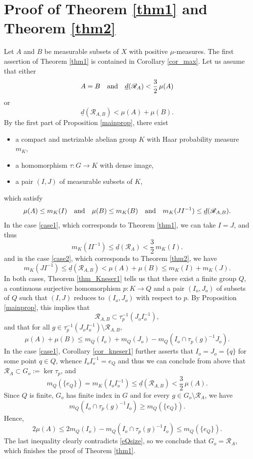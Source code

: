 \documentclass[JEP,XML,SOM,Unicode]{cedram}
\let\mathcal\mathscr
\newcommand{\cR}{\mathcal{R}}
\newcommand{\qand}{\quad\textup{and}\quad}
\theoremstyle{plain}
\theoremstyle{definition}
\begin{document}
\section{Proof of Theorem \ref{thm1} and Theorem \ref{thm2}}

Let $A$ and $B$ be measurable subsets of $X$ with positive $\mu$-measures. The first assertion of Theorem \ref{thm1} is contained
in Corollary \ref{cor_max}. Let us assume that either
\begin{equation}
\label{case1}
A = B \qand \underline{d}(\cR_{A}) < \frac{3}{2}\, \mu(A)
\end{equation}
or
\begin{equation}
\label{case2}
\underline{d}(\cR_{A,B}) < \mu(A) + \mu(B).
\end{equation}
By the first part of Proposition \ref{mainprop}, there exist
\begin{itemize}
\item a compact and metrizable abelian group $K$ with Haar probability measure $m_K$,
\item a homomorphism $\tau : G \to K$ with dense image,
\item a pair $(I,J)$ of measurable subsets of $K$,
\end{itemize}
which satisfy
\[
\mu(A) \leq m_K(I) \qand \mu(B) \leq m_K(B) \qand m_K(JI^{-1}) \leq \underline{d}(\cR_{A,B}).
\]
In the case \eqref{case1}, which corresponds to Theorem \ref{thm1}, we can take $I = J$, and thus
\[
m_K(II^{-1}) \leq \underline{d}(\cR_{A}) < \frac{3}{2} \, m_K(I).
\]
and in the case \eqref{case2}, which corresponds to Theorem \ref{thm2}, we have
\[
m_K(JI^{-1}) \leq \underline{d}(\cR_{A,B}) < \mu(A) + \mu(B) \leq m_K(I) + m_K(J).
\]
In both cases, Theorem \ref{thm_Kneser1} tells us that there exist a finite group $Q$, a continuous surjective homomorphism
$p : K \to Q$ and a pair $(I_o,J_o)$ of subsets of $Q$ such that $(I,J)$ reduces to $(I_o,J_o)$ with respect to $p$.
By Proposition \ref{mainprop}, this implies that
\[
\cR_{A,B} \subset \tau_p^{-1}(J_o I_o^{-1}),
\]
and that for all $g \in \tau_p^{-1}(J_o I_o^{-1}) \setminus \cR_{A,B}$,
\[
\mu(A) + \mu(B) \leq m_Q(I_o) + m_Q(J_o) - m_Q(I_o \cap \tau_p(g)^{-1}J_o).
\]
In the case \eqref{case1}, Corollary \ref{cor_kneser1} further asserts that $I_o = J_o = \{q\}$ for some point $q \in Q$, whence
$I_o I_o^{-1} = e_Q$ and thus we can conclude from above that $\cR_{A} \subset G_o := \ker \tau_p$, and
\begin{equation}
\label{eQsize}
m_Q(\{e_Q\}) = m_K(I_o I_o^{-1}) \leq \underline{d}(\cR_{A,B}) < \frac{3}{2}\, \mu(A).
\end{equation}
Since $Q$ is finite, $G_o$ has finite index in $G$ and for every $g \in G_o \setminus \cR_A$, we have
\[
m_Q(I_o \cap \tau_p(g)^{-1}I_o) \geq m_Q(\{e_Q\}).
\]
Hence,
\[
2\mu(A) \leq 2m_Q(I_o) - m_Q(I_o \cap \tau_p(g)^{-1}I_o) \leq m_Q(\{e_Q\}).
\]
The last inequality clearly contradicts \eqref{eQsize}, so we conclude that $G_o = \cR_A$, which finishes the proof of Theorem \ref{thm1}.
\end{document}
